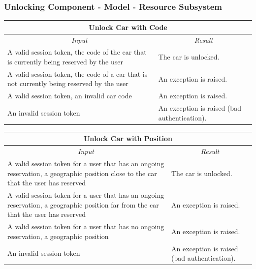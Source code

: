 \documentclass[english]{article}
\begin{document}
\subsubsection{Unlocking Component - Model - Resource Subsystem}

\begin{center}
	\begin{tabular}{ | p{6cm} | p{6cm} | }
		\hline 
		\multicolumn{2}{|c|}{\textbf{Unlock Car with Code}} \\
		\hline
		\multicolumn{1}{|c|}{\textit{Input}} & \multicolumn{1}{c|}{\textit{Result}} \\
		\hline
		A valid session token, the code of the car that is currently being reserved by the user & The car is unlocked. \\
		\hline
		A valid session token, the code of a car that is not currently being reserved by the user & An exception is raised. \\
		\hline
		A valid session token, an invalid car code & An exception is raised. \\
		\hline
		An invalid session token & An exception is raised (bad authentication). \\
		\hline
	\end{tabular}
\end{center}

\begin{center}
	
	\begin{tabular}{ | p{6cm} | p{6cm} | }
		\hline 
		\multicolumn{2}{|c|}{\textbf{Unlock Car with Position}} \\
		\hline
		\multicolumn{1}{|c|}{\textit{Input}} & \multicolumn{1}{c|}{\textit{Result}} \\
		\hline
		A valid session token for a user that has an ongoing reservation, a geographic position close to the car that the user has reserved  & The car is unlocked. \\
		\hline
		A valid session token for a user that has an ongoing reservation, a geographic position far from the car that the user has reserved & An exception is raised. \\
		\hline
		A valid session token for a user that has no ongoing reservation, a geographic position & An exception is raised. \\
		\hline
		An invalid session token & An exception is raised (bad authentication). \\
		\hline
	\end{tabular}
\end{center}
\end{document}
